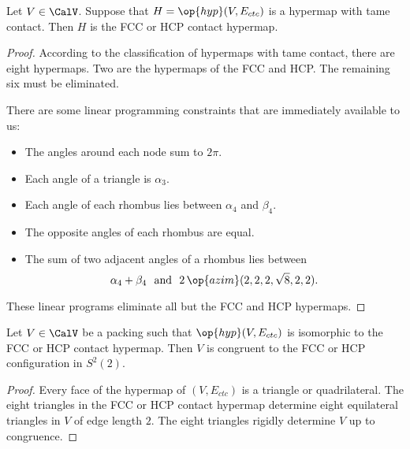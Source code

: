 \begin{lemma}[]\label{lemma:fcc-ft} Let $V\in \CalV$.
  Suppose that $H=\op{hyp}(V,E_{ctc})$ is a hypermap with tame
  contact.  Then $H$ is the FCC or HCP contact hypermap.
\end{lemma}

\begin{proof} According to the classification of hypermaps with tame
  contact, there are eight hypermaps.  Two are the hypermaps of the
  FCC and HCP.  The remaining six must be eliminated.

There are some linear
  programming constraints that are immediately available to us:
\begin{itemize}
\item The angles around each node sum to $2\pi$.
\item Each angle of a triangle is $\alpha_3$.
\item Each angle of each rhombus lies between $\alpha_4$ and $\beta_4$.
\item The opposite angles of each rhombus are equal.
\item The sum of two adjacent angles of a rhombus lies between
\begin{displaymath}
  \alpha_4 + \beta_4 \text{~~and~~} 2\,\op{azim}(2,2,2,\sqrt8,2,2).
\end{displaymath}
\end{itemize}
These linear programs eliminate all but the FCC and HCP hypermaps.
\end{proof}


\begin{lemma}[]\label{lemma:kiss-fcc}
  Let $V\in \CalV$ be a packing such that $\op{hyp}(V,E_{ctc})$ is
  isomorphic to the FCC or HCP contact hypermap.  Then $V$ is
  congruent to the FCC or HCP configuration in $S^2(2)$.
\end{lemma}
%
%
%
%
%

\begin{proof} Every face of the hypermap of $(V,E_{ctc})$ is a
  triangle or quadrilateral.  The eight triangles in the FCC or HCP
  contact hypermap determine eight equilateral triangles in $V$ of
  edge length $2$.  The eight triangles rigidly determine $V$ up to
  congruence.
\end{proof}

